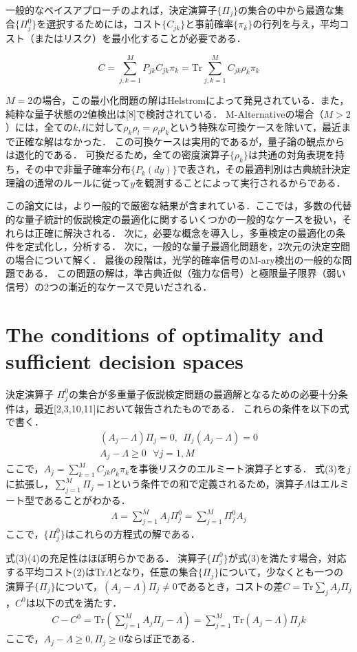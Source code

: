 \documentclass{ltjsarticle}
\begin{document}
一般的なベイスアプローチのよれば，決定演算子$\{\Pi_j\}$の集合の中から最適な集合$\{ \Pi_j^0\}$を選択するためには，コスト$\{ C_{jk} \}$と事前確率$\{ \pi_k \}$の行列を与え，平均コスト（またはリスク）を最小化することが必要である．

\begin{equation}
  C = \sum_{j,k=1}^{M} P_{jk} C_{jk} \pi_k = \mathrm{Tr} \sum_{j,k=1}^{M} C_{jk} \rho_k \pi_k
\end{equation}

$M=2$の場合，この最小化問題の解はHelstromによって発見されている．また，純粋な量子状態の2値検出は[8]で検討されている．
M-Alternativeの場合（$M>2$）には，全ての$k,l$に対して$\rho_k \rho_l = \rho_l \rho_k$という特殊な可換ケースを除いて，最近まで正確な解はなかった．
この可換ケースは実用的であるが，量子論の観点からは退化的である．
可換だるため，全ての密度演算子$\{\rho_k\}$は共通の対角表現を持ち，その中で非量子確率分布$\{P_k(dy)\}$で表され，その最適判別は古典統計決定理論の通常のルールに従って$y$を観測することによって実行されるからである．

この論文には，より一般的で厳密な結果が含まれている．ここでは，多数の代替的な量子統計的仮説検定の最適化に関するいくつかの一般的なケースを扱い，それらは正確に解決される．
次に，必要な概念を導入し，多重検定の最適化の条件を定式化し，分析する．
次に，一般的な量子最適化問題を，2次元の決定空間の場合について解く．
最後の段階は，光学的確率信号のM-ary検出の一般的な問題である．
この問題の解は，準古典近似（強力な信号）と極限量子限界（弱い信号）の2つの漸近的なケースで見いだされる．

\section{The conditions of optimality and sufficient decision spaces}
決定演算子 $\Pi_j^0$の集合が多重量子仮説検定問題の最適解となるための必要十分条件は，最近[2,3,10,11]において報告されたものである．
これらの条件を以下の式で書く．
\begin{eqnarray}
  (A_j - \Lambda) \Pi_j = 0, \ \ \Pi_j(A_j - \Lambda) = 0 \\
  A_j - \Lambda \geq 0\ \ \ \forall  j = 1, M
\end{eqnarray}
ここで，$A_j = \sum_{k=1}^{M} C_{jk} \rho_k \pi_k $を事後リスクのエルミート演算子とする．
式(3)を$j$に拡張し，$\sum_{j=1}^{M} \Pi_j = 1$という条件での和で定義されるため，演算子$\Lambda$はエルミート型であることがわかる．
\begin{eqnarray}
  \Lambda = \sum_{j=1}^{M} A_j \Pi_j^0 = \sum_{j=1}^{M} \Pi_j^0 A_j
\end{eqnarray}
ここで，$\{ \Pi_j^0\}$はこれらの方程式の解である．

式(3)(4)の充足性はほぼ明らかである．
演算子$\{\Pi_j^0\}$が式(3)を満たす場合，対応する平均コスト(2)は$\mathrm{Tr}\Lambda$となり，任意の集合$\{\Pi_j\}$について，少なくとも一つの演算子$\{\Pi_j\}$について，$(A_j - \Lambda) \Pi_j \neq 0$であるとき，コストの差$C = \mathrm{Tr}\sum_{j}A_j \Pi_j$，$C^0$は以下の式を満たす．
\begin{eqnarray}
  C - C^0 = \mathrm{Tr}
  \left(
    \sum_{j = 1}^{M} A_j \Pi_j - \Lambda
  \right) =
  \sum_{j=1}^{M} \mathrm{Tr} (A_j - \Lambda) \Pi_jk
\end{eqnarray}
ここで，$A_j - \Lambda \geq 0, \Pi_j \geq 0$ならば正である．
\end{document}
